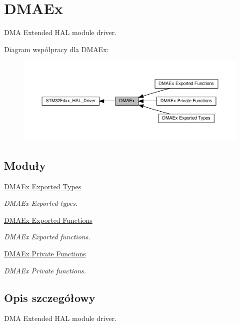 \hypertarget{group___d_m_a_ex}{}\section{D\+M\+A\+Ex}
\label{group___d_m_a_ex}


D\+MA Extended H\+AL module driver.  


Diagram współpracy dla D\+M\+A\+Ex\+:\nopagebreak
\begin{figure}[H]
\begin{center}
\leavevmode
\includegraphics[width=350pt]{group___d_m_a_ex}
\end{center}
\end{figure}
\subsection*{Moduły}
\begin{DoxyCompactItemize}
\item 
\hyperlink{group___d_m_a_ex___exported___types}{D\+M\+A\+Ex Exported Types}
\begin{DoxyCompactList}\small\item\em D\+M\+A\+Ex Exported types. \end{DoxyCompactList}\item 
\hyperlink{group___d_m_a_ex___exported___functions}{D\+M\+A\+Ex Exported Functions}
\begin{DoxyCompactList}\small\item\em D\+M\+A\+Ex Exported functions. \end{DoxyCompactList}\item 
\hyperlink{group___d_m_a_ex___private___functions}{D\+M\+A\+Ex Private Functions}
\begin{DoxyCompactList}\small\item\em D\+M\+A\+Ex Private functions. \end{DoxyCompactList}\end{DoxyCompactItemize}


\subsection{Opis szczegółowy}
D\+MA Extended H\+AL module driver. 

